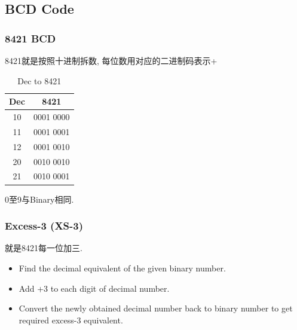 \documentclass[scheme=chinese,a4paper]{report}
\begin{document}
\subsection{BCD Code}
\subsubsection{8421 BCD}
8421就是按照十进制拆数, 每位数用对应的二进制码表示+\par

\begin{table}[htb]
    \centering
    \caption{Dec to 8421}
    \begin{tabular}{c c}
        Dec & 8421 \\
        \hline
        10 & 0001 0000\\
        11 & 0001 0001\\
        12 & 0001 0010\\
        20 & 0010 0010\\
        21 & 0010 0001\\
    \end{tabular}
\end{table}
0至9与Binary相同. 

\subsubsection{Excess-3 (XS-3)}
就是8421每一位加三. 
\begin{itemize}
    \item Find the decimal equivalent of the given binary number.
    \item Add +3 to each digit of decimal number.
    \item Convert the newly obtained decimal number back to binary number to get required excess-3 equivalent.
\end{itemize}
\end{document}

